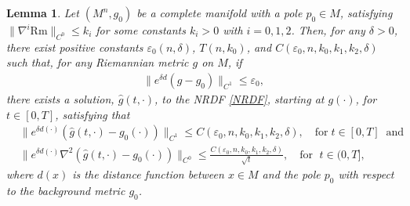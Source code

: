 \documentclass[12pt]{amsart}
\newtheorem{lemma}{Lemma}[section]
\begin{document}
\begin{lemma}\label{short time existence with weight}
    Let $(M^n, g_0)$ be a complete manifold with a pole $p_0 \in M$, satisfying $\|\nabla^{i}\mathrm{Rm}\|_{C^0}\leq k_i$ for some constants $k_i > 0$ with $i = 0, 1, 2$. Then, for any $\delta > 0$, there exist positive constants $\varepsilon_0(n, \delta)$, $T(n, k_0)$, and $C(\varepsilon_0, n, k_0, k_1, k_2, \delta)$ such that, for any Riemannian metric $g$ on $M$, if
    \begin{align*}
        \| e^{\delta d}(g - g_0)\|_{C^1} \leq \varepsilon_0, 
    \end{align*}
    there exists a solution, $\hat{g}(t,\cdot)$, to the NRDF \eqref{NRDF}, starting at $g(\cdot)$, for $t\in [0, T]$, satisfying that 
    \begin{equation}\label{result of short time existence with weight}
        \begin{split}
            &\|e^{\delta d(\cdot)}(\hat{g}(t, \cdot) - g_0(\cdot))\|_{C^1} \leq C( \varepsilon_0, n, k_0, k_1, k_2, \delta),\quad \text{for}\; t\in [0, T]\;\; \text{and}\\
            &\|e^{\delta d(\cdot)}\nabla^2 (\hat{g}(t, \cdot) - g_0(\cdot))\|_{C^0} \leq \frac{C(\varepsilon_0, n, k_0, k_1, k_2, \delta)}{\sqrt{t}},\quad \text{for } \; t \in (0, T], 
        \end{split}
    \end{equation}
    where $d(x)$ is the distance function between $x\in M$ and the pole $p_0$ with respect to the background metric $g_0$.
\end{lemma}
\end{document}
